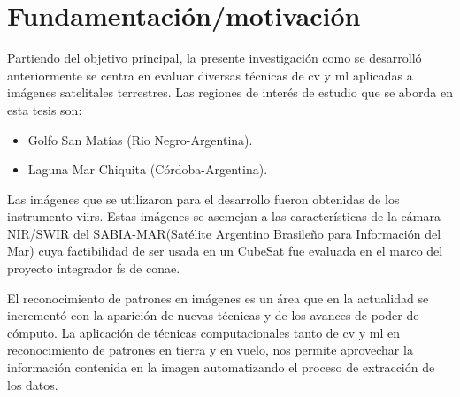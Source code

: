 \section{Fundamentación/motivación}\label{sec:fundamentacion}

Partiendo del objetivo principal, la presente investigación como se desarrolló anteriormente se centra en evaluar diversas técnicas de \ac{cv} y \ac{ml} aplicadas a imágenes satelitales terrestres. Las regiones de interés de estudio que se aborda en esta tesis son:
\begin{itemize}
	\item Golfo San Matías (Rio Negro-Argentina).
	\item Laguna Mar Chiquita (Córdoba-Argentina).
\end{itemize}

Las imágenes que se utilizaron para el desarrollo fueron obtenidas de los instrumento  \ac{viirs}. Estas imágenes se asemejan a las características de la cámara NIR/SWIR del SABIA-MAR(Satélite Argentino Brasileño para Información del Mar) cuya factibilidad de ser usada en un CubeSat fue evaluada en el marco del proyecto integrador \ac{fs} de \ac{conae}.

El reconocimiento de patrones en imágenes es un área que en la actualidad se incrementó con la aparición de nuevas técnicas y de los avances de poder de cómputo. La aplicación de técnicas computacionales tanto de  \ac{cv} y \ac{ml} en reconocimiento de patrones  en tierra y en vuelo, nos permite aprovechar la información contenida en la imagen  automatizando el proceso de extracción de los datos.

